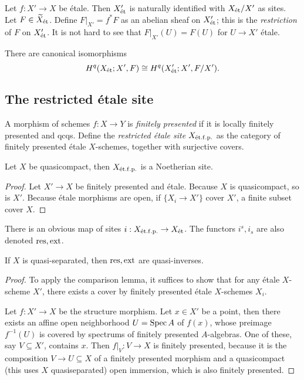 \documentclass[11pt]{amsart}
\begin{document}
\begin{defn}
Let $f:X'\to X$ be \'etale. Then $X'_{\operatorname{\acute{e}t}}$ is naturally identified with $X_{\operatorname{\acute{e}t}}/X'$ as sites. Let $F\in \widetilde{X}_{\operatorname{\acute{e}t}}$. Define $F|_{X'} = f^\ast F$ as an abelian sheaf on $X'_{\operatorname{\acute{e}t}}$; this is the \emph{restriction} of $F$ on $X'_{\operatorname{\acute{e}t}}$. It is not hard to see that $F|_{X'}(U) = F(U)$ for $U\to X'$ \'etale.
\end{defn}

\begin{cor}
    There are canonical isomorphisms
    \[H^q(X_{\operatorname{\acute{e}t}}; X', F) \cong H^q(X'_{\operatorname{\acute{e}t}}; X', F/X').\]
\end{cor}


\subsection{The restricted \'etale site}

\begin{defn}
    A morphism of schemes $f:X\to Y$ is \emph{finitely presented} if it is locally finitely presented and qcqs. Define the \emph{restricted \'etale site} $X_{\operatorname{\acute{e}t.f.p.}}$ as the category of finitely presented \'etale $X$-schemes, together with surjective covers.
\end{defn}

\begin{prop}
    Let $X$ be quasicompact, then $X_{\operatorname{\acute{e}t.f.p.}}$ is a Noetherian site.
\end{prop}

\begin{proof}
    Let $X'\to X$ be finitely presented and \'etale. Because $X$ is quasicompact, so is $X'$. Because \'etale morphisms are open, if $\{X_i\to X'\}$ cover $X'$, a finite subset cover $X$.
\end{proof}

There is an obvious map of sites $i: X_{\operatorname{\acute{e}t.f.p.}}\to X_{\operatorname{\acute{e}t}}$. The functors $i^s, i_s$ are also denoted $\operatorname{res}, \operatorname{ext}$.


\begin{prop}
    If $X$ is quasi-separated, then $\operatorname{res}, \operatorname{ext}$ are quasi-inverses.
\end{prop}

\begin{proof}
    To apply the comparison lemma, it suffices to show that for any \'etale $X$-scheme $X'$, there exists a cover by finitely presented 
    \'etale $X$-schemes $X_i$.
    
    Let $f:X'\to X$ be the structure morphism. Let $x\in X'$ be a point, then there exists an affine open neighborhood $U =\operatorname{Spec} A$ of $f(x)$, whose preimage $f^{-1}(U)$ is covered by spectrums of finitely presented $A$-algebras. One of these, say $V \subseteq X'$, contains $x$. Then $f|_{V}: V\to X$ is finitely presented, because it is the composition $V\to U\subseteq X$ of a finitely presented morphism and a quasicompact (this uses $X$ quasiseparated) open immersion, which is also finitely presented.
\end{proof}
\end{document}
